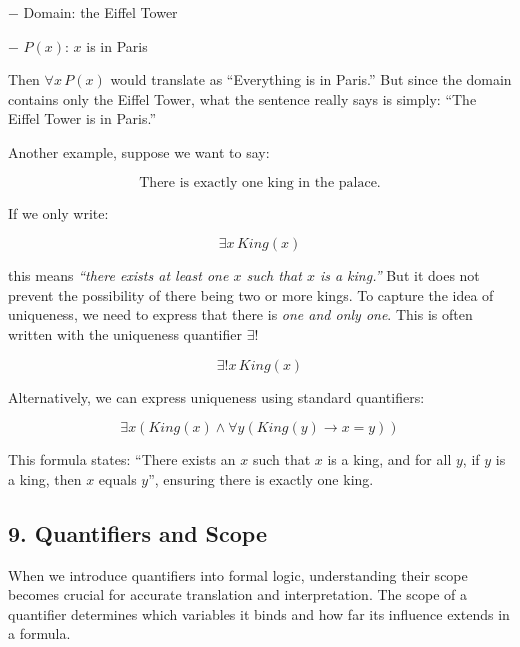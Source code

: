 − Domain: the Eiffel Tower

− \(P(x)\): \(x\) is in Paris

Then \(\forall x \, P(x)\) would translate as ``Everything is in
Paris.'' But since the domain contains only the Eiffel Tower, what the
sentence really says is simply: ``The Eiffel Tower is in Paris.''

Another example, suppose we want to say:

\[\text{There is exactly one king in the palace.}\]

If we only write:

\[\exists x \, King(x)\]

this means \emph{``there exists at least one \(x\) such that \(x\) is a
king.''} But it does not prevent the possibility of there being two or
more kings. To capture the idea of uniqueness, we need to express that
there is \emph{one and only one}. This is often written with the
uniqueness quantifier \(\exists!\)

\[\exists! x \, King(x)\]

Alternatively, we can express uniqueness using standard quantifiers:

\[\exists x (King(x) \land \forall y (King(y) \rightarrow x = y))\]

This formula states: ``There exists an \(x\) such that \(x\) is a king,
and for all \(y\), if \(y\) is a king, then \(x\) equals \(y\)'',
ensuring there is exactly one king.

\subsection{9. Quantifiers and Scope}\label{quantifiers-and-scope}

When we introduce quantifiers into formal logic, understanding their
scope becomes crucial for accurate translation and interpretation. The
scope of a quantifier determines which variables it binds and how far
its influence extends in a formula.

